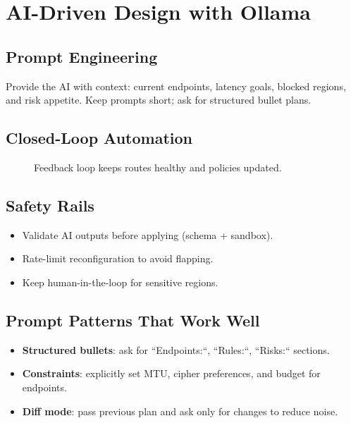 \chapter{AI-Driven Design with Ollama}

\section{Prompt Engineering}
Provide the AI with context: current endpoints, latency goals, blocked regions, and risk appetite. Keep prompts short; ask for structured bullet plans.

\section{Closed-Loop Automation}
\begin{figure}[h]
    \centering
    \caption{Feedback loop keeps routes healthy and policies updated.}
\end{figure}

\section{Safety Rails}
\begin{itemize}
    \item Validate AI outputs before applying (schema + sandbox).
    \item Rate-limit reconfiguration to avoid flapping.
    \item Keep human-in-the-loop for sensitive regions.
\end{itemize}

\section{Prompt Patterns That Work Well}
\begin{itemize}
    \item \textbf{Structured bullets}: ask for ``Endpoints:``, ``Rules:``, ``Risks:`` sections.
    \item \textbf{Constraints}: explicitly set MTU, cipher preferences, and budget for endpoints.
    \item \textbf{Diff mode}: pass previous plan and ask only for changes to reduce noise.
\end{itemize}

